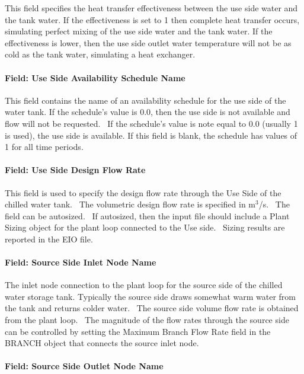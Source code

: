 This field specifies the heat transfer effectiveness between the use side water and the tank water. If the effectiveness is set to 1 then complete heat transfer occurs, simulating perfect mixing of the use side water and the tank water. If the effectiveness is lower, then the use side outlet water temperature will not be as cold as the tank water, simulating a heat exchanger.

\paragraph{Field: Use Side Availability Schedule Name}\label{field-use-side-availability-schedule-name}

This field contains the name of an availability schedule for the use side of the water tank. If the schedule's value is 0.0, then the use side is not available and flow will not be requested.~ If the schedule's value is note equal to 0.0 (usually 1 is used), the use side is available. If this field is blank, the schedule has values of 1 for all time periods.

\paragraph{Field: Use Side Design Flow Rate}\label{field-use-side-design-flow-rate}

This field is used to specify the design flow rate through the Use Side of the chilled water tank.~ The volumetric design flow rate is specified in m\(^{3}\)/s.~ The field can be autosized.~ If autosized, then the input file should include a Plant Sizing object for the plant loop connected to the Use side.~ Sizing results are reported in the EIO file.

\paragraph{Field: Source Side Inlet Node Name}\label{field-source-side-inlet-node-name-4}

The inlet node connection to the plant loop for the source side of the chilled water storage tank. Typically the source side draws somewhat warm water from the tank and returns colder water.~ The source side volume flow rate is obtained from the plant loop.~ The magnitude of the flow rates through the source side can be controlled by setting the Maximum Branch Flow Rate field in the BRANCH object that connects the source inlet node.

\paragraph{Field: Source Side Outlet Node Name}\label{field-source-side-outlet-node-name-4}

